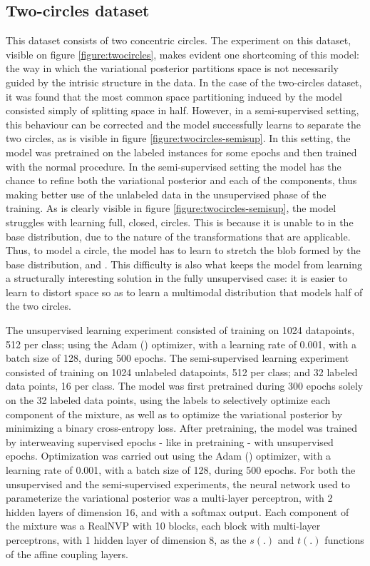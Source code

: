 \subsection{Two-circles dataset}
This dataset consists of two concentric circles. The experiment on this dataset,
visible on figure \ref{figure:twocircles}, makes evident one shortcoming of this
model: the way in which the variational posterior partitions space is
not necessarily guided by the intrisic structure in the data. In the case of
the two-circles dataset, it was found that the most common space partitioning
induced by the model consisted simply of splitting space in half. However, in
a semi-supervised setting, this behaviour can be corrected and the model
successfully learns to separate the two circles, as is visible in figure
\ref{figure:twocircles-semisup}. In this setting, the model was pretrained on
the labeled instances for some epochs and then trained with the normal procedure.
In the semi-supervised setting the model has the chance to refine both the
variational posterior and each of the components, thus making better use of
the unlabeled data in the unsupervised phase of the training. As is clearly
visible in figure \ref{figure:twocircles-semisup}, the model struggles with
learning full, closed, circles. This is because it is unable to 
in the base distribution, due to the nature of the transformations that are
applicable. Thus, to model a circle, the model has to learn to stretch the blob
formed by the base distribution, and . This difficulty
is also what keeps the model from learning a structurally interesting solution
in the fully unsupervised case: it is easier to learn to distort space so as to
learn a multimodal distribution that models half of the two circles.

The unsupervised learning experiment consisted of training on 1024 datapoints,
512 per class; using the Adam (\autocite{adam}) optimizer, with a learning rate
of 0.001, with a batch size of 128, during 500 epochs.
The semi-supervised learning experiment consisted of training on 1024 unlabeled
datapoints, 512 per class; and 32 labeled data points, 16 per class. The model
was first pretrained during 300 epochs solely on the 32 labeled data points, using
the labels to selectively optimize each component of the mixture, as well as
to optimize the variational posterior by minimizing a binary cross-entropy loss.
After pretraining, the model was trained by interweaving supervised epochs - like
in pretraining - with unsupervised epochs. Optimization was carried out using the
Adam (\autocite{adam}) optimizer, with a learning rate of 0.001, with a batch size
of 128, during 500 epochs.
For both the unsupervised and the semi-supervised experiments, the neural network
used to parameterize the variational posterior was a multi-layer perceptron, with
2 hidden layers of dimension 16, and with a softmax output. Each component of the
mixture was a RealNVP with 10 blocks, each block with multi-layer perceptrons,
with 1 hidden layer of dimension 8, as the $s(.)$ and $t(.)$ functions of the
affine coupling layers.

